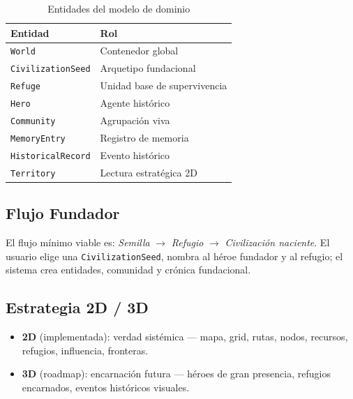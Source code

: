 \documentclass[11pt,a4paper,twocolumn]{article}
\begin{document}
\begin{table}[h]
  \centering
  \caption{Entidades del modelo de dominio}
  \label{tab:dominio}
  \small
  \begin{tabular}{p{1.8cm}p{3.8cm}}
    \toprule
    \textbf{Entidad} & \textbf{Rol} \\
    \midrule
    \texttt{World}            & Contenedor global \\
    \texttt{CivilizationSeed} & Arquetipo fundacional \\
    \texttt{Refuge}           & Unidad base de supervivencia \\
    \texttt{Hero}             & Agente hist\'orico \\
    \texttt{Community}        & Agrupaci\'on viva \\
    \texttt{MemoryEntry}      & Registro de memoria \\
    \texttt{HistoricalRecord} & Evento hist\'orico \\
    \texttt{Territory}        & Lectura estrat\'egica 2D \\
    \bottomrule
  \end{tabular}
\end{table}

\subsection{Flujo Fundador}

El flujo m\'inimo viable es:
\textit{Semilla} $\to$ \textit{Refugio} $\to$ \textit{Civilizaci\'on
naciente}. El usuario elige una \texttt{CivilizationSeed}, nombra al
h\'eroe fundador y al refugio; el sistema crea entidades, comunidad y
cr\'onica fundacional.

\subsection{Estrategia 2D / 3D}

\begin{itemize}[leftmargin=1em, itemsep=2pt, topsep=2pt]
  \item \textbf{2D} (implementada): verdad sist\'emica --- mapa, grid,
        rutas, nodos, recursos, refugios, influencia, fronteras.
  \item \textbf{3D} (roadmap): encarnaci\'on futura --- h\'eroes de gran
        presencia, refugios encarnados, eventos hist\'oricos visuales.
\end{itemize}

\end{document}
